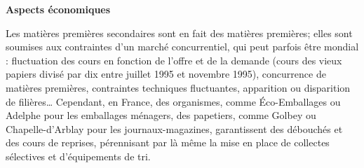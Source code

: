 \textbf{Aspects économiques}
\vspace{0.3 cm}

Les matières premières secondaires sont en fait des matières premières; elles sont soumises aux contraintes d’un marché concurrentiel, qui peut parfois être mondial : fluctuation des cours en fonction de l’offre et de la demande (cours des vieux papiers divisé par dix entre juillet 1995 et novembre 1995), concurrence de matières premières, contraintes techniques fluctuantes, apparition ou disparition de filières…
Cependant, en France, des organismes, comme Éco-Emballages ou Adelphe pour les emballages ménagers, des papetiers, comme Golbey ou Chapelle-d’Arblay pour les journaux-magazines, garantissent des débouchés et des cours de reprises, pérennisant par là même la mise en place de collectes sélectives et d’équipements de tri.
